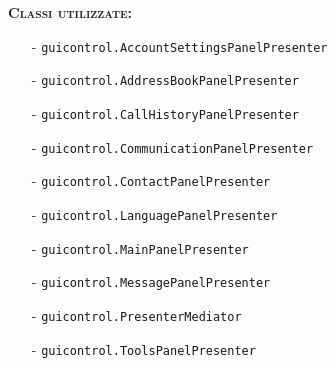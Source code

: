 \begin{description}
	\item{\scshape\bfseries Classi utilizzate:}\\
	\begin{itemize}[noitemsep,nolistsep]
	  \item[-] \texttt{guicontrol.AccountSettingsPanelPresenter}
	  \item[-] \texttt{guicontrol.AddressBookPanelPresenter}
	  \item[-] \texttt{guicontrol.CallHistoryPanelPresenter}
	  \item[-] \texttt{guicontrol.CommunicationPanelPresenter}
	  \item[-] \texttt{guicontrol.ContactPanelPresenter}
	  \item[-] \texttt{guicontrol.LanguagePanelPresenter}
	  \item[-] \texttt{guicontrol.MainPanelPresenter}
		\item[-] \texttt{guicontrol.MessagePanelPresenter}
		\item[-] \texttt{guicontrol.PresenterMediator}
	  \item[-] \texttt{guicontrol.ToolsPanelPresenter}
	\end{itemize}
\end{description}

